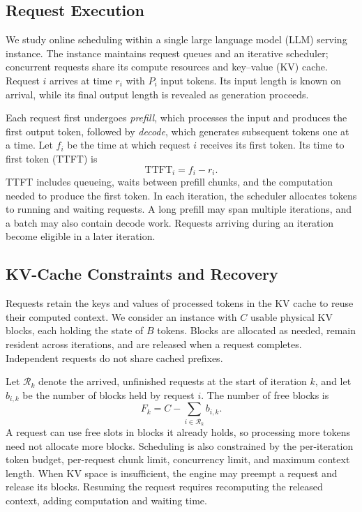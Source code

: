 \documentclass[sigconf,anonymous,review]{acmart}
\begin{document}
\subsection{Request Execution}
\label{sec:request-execution}

We study online scheduling within a single large language model (LLM) serving instance. The instance maintains request queues and an iterative scheduler; concurrent requests share its compute resources and key--value (KV) cache. Request $i$ arrives at time $r_i$ with $P_i$ input tokens. Its input length is known on arrival, while its final output length is revealed as generation proceeds.

Each request first undergoes \emph{prefill}, which processes the input and produces the first output token, followed by \emph{decode}, which generates subsequent tokens one at a time. Let $f_i$ be the time at which request $i$ receives its first token. Its time to first token (TTFT) is
\begin{equation}
    \mathrm{TTFT}_i = f_i-r_i.
    \label{eq:ttft}
\end{equation}
TTFT includes queueing, waits between prefill chunks, and the computation needed to produce the first token. In each iteration, the scheduler allocates tokens to running and waiting requests. A long prefill may span multiple iterations, and a batch may also contain decode work. Requests arriving during an iteration become eligible in a later iteration.

\subsection{KV-Cache Constraints and Recovery}
\label{sec:kv-constraints}

Requests retain the keys and values of processed tokens in the KV cache to reuse their computed context. We consider an instance with $C$ usable physical KV blocks, each holding the state of $B$ tokens. Blocks are allocated as needed, remain resident across iterations, and are released when a request completes. Independent requests do not share cached prefixes.

Let $\mathcal R_k$ denote the arrived, unfinished requests at the start of iteration $k$, and let $b_{i,k}$ be the number of blocks held by request $i$. The number of free blocks is
\begin{equation}
    F_k=C-\sum_{i\in\mathcal R_k} b_{i,k}.
    \label{eq:free-kv-blocks}
\end{equation}
A request can use free slots in blocks it already holds, so processing more tokens need not allocate more blocks. Scheduling is also constrained by the per-iteration token budget, per-request chunk limit, concurrency limit, and maximum context length. When KV space is insufficient, the engine may preempt a request and release its blocks. Resuming the request requires recomputing the released context, adding computation and waiting time.
\end{document}
